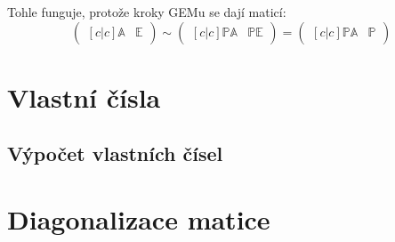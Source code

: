 \documentclass{../szzclass}
\begin{document}
Tohle funguje, protože kroky GEMu se dají  maticí:
\begin{equation}
\begin{pmatrix}[c|c]
\mathbb{A} & \mathbb{E}
\end{pmatrix} \sim
\begin{pmatrix}[c|c]
\mathbb{P}\mathbb{A} & \mathbb{P}\mathbb{E}
\end{pmatrix} =
\begin{pmatrix}[c|c]
\mathbb{P}\mathbb{A} & \mathbb{P}
\end{pmatrix}
\end{equation}

\section{Vlastní čísla}
\subsection{Výpočet vlastních čísel}
\section{Diagonalizace matice}
\end{document}
